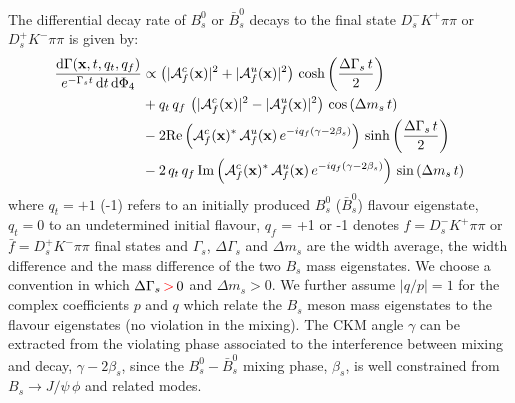 The differential decay rate of $B_s^{0}$ or $\bar B_s^{0}$ decays to the final state $D_s^{-} K^{+} \pi\pi$ or $D_s^{+} K^{-} \pi\pi$
is given by: 
\begin{equation}
\begin{split}
\label{eq:PDF_full}
	\frac{ \text{d}\Gamma(\mathbf{x},t,q_t,q_f)}{ e^{- \Gamma_s t} \, \text{d}t \, \text{d}\Phi_4} &\propto  
	 \left( \vert \mathcal A^c_{f}(\mathbf{x}) \vert^2 + \vert \mathcal A^u_{f}(\mathbf{x}) \vert^2 \right) \, \text{cosh} \left( \frac{\Delta \Gamma_s \, t}{2}\right) \\
	 & + q_t \, q_f \,  \left( \vert \mathcal A^c_{f}(\mathbf{x}) \vert^2 - \vert \mathcal A^u_{f}(\mathbf{x})  \vert^2 \right) \, \text{cos} \left(\Delta m_s \, t \right)  \\
	 & -2 \text{Re}\left( \mathcal A^c_{f}(\mathbf{x})^{*}  \, \mathcal A^u_{f}(\mathbf{x})  \, e^{-i q_f (\gamma - 2\beta_s)}  \right) \, \text{sinh} \left( \frac{\Delta \Gamma_s \, t}{2}\right)  \\
	 & -2 \, q_t \, q_f \, \text{Im}\left( \mathcal A^c_{f}(\mathbf{x})^{*} \, \mathcal A^u_{f}(\mathbf{x})  \, e^{-i q_f (\gamma - 2\beta_s)}  \right)\, \text{sin} \left(\Delta m_s \, t \right)  
\end{split}
\end{equation}
where $q_t = +1$ (-1) refers to an initially produced $B_s^{0}$ ($\bar B_s^{0}$) flavour eigenstate, $q_t = 0$ to an undetermined initial flavour,
$q_f$ = +1  or -1 denotes $f = D_s^{-} K^{+} \pi\pi$ or $\bar f = D_s^{+} K^{-} \pi\pi$ final states
and $\Gamma_s$, $\Delta \Gamma_s$ and $\Delta m_s$ are 
the width average, the width difference 
and the mass difference of the two $B_s$ 
mass eigenstates.
We choose a convention in which $\Delta\Gamma_s \, \textcolor{red}{ > } \, 0$ and $\Delta m_s > 0$. 
We further assume $\vert q/p \vert = 1$ for the complex coefficients $p$ and $q$ which relate the $B_s$ meson mass eigenstates to the flavour eigenstates (no \CP violation
in the mixing).
The CKM angle $\gamma$ can be extracted from the \CP violating phase associated to the interference between mixing and decay, $\gamma - 2 \beta_s $, 
since the $B_s^{0}-\bar B_s^{0}$ mixing phase, $\beta_s$, is well constrained from $B_s \to J/\psi \, \phi$ and related modes. 


